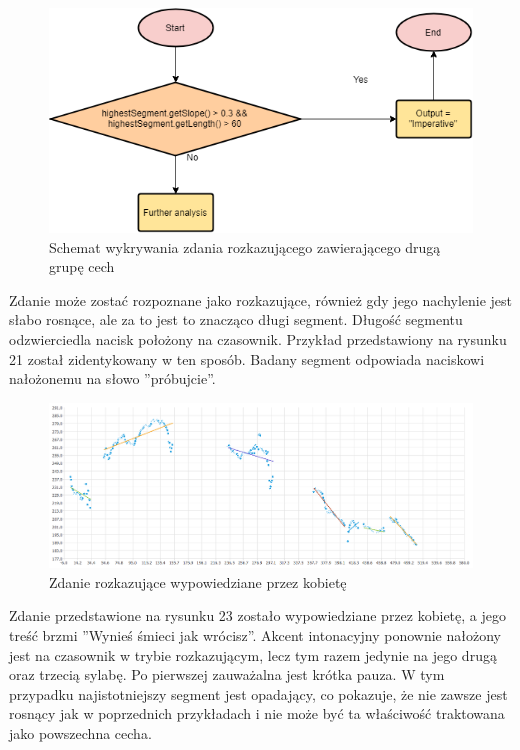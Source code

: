 \documentclass[a4paper,12 pt]{report}
\begin{document}
 \FloatBarrier
\begin{figure}[h]
\centering
\includegraphics[scale=0.9]{Imperative2.png}
\caption{Schemat wykrywania zdania rozkazującego zawierającego drugą grupę cech}
\end{figure}
\FloatBarrier
Zdanie może zostać rozpoznane jako rozkazujące, również gdy jego nachylenie jest słabo rosnące, ale za to jest to znacząco długi segment. Długość segmentu odzwierciedla nacisk położony na czasownik. Przykład przedstawiony na rysunku 21 został zidentykowany w ten sposób. Badany segment odpowiada naciskowi nałożonemu na słowo ''próbujcie''.
 \FloatBarrier
\begin{figure}[h]
\centering
\includegraphics[scale=0.6]{rozkaz_3.png}
\caption{Zdanie rozkazujące wypowiedziane przez kobietę}
\end{figure}
\FloatBarrier
Zdanie przedstawione na rysunku 23 zostało wypowiedziane przez kobietę, a jego treść brzmi ''Wynieś śmieci jak wrócisz''. Akcent intonacyjny ponownie nałożony jest na czasownik w trybie rozkazującym, lecz tym razem jedynie na jego drugą oraz trzecią sylabę. Po pierwszej zauważalna jest krótka pauza.
W tym przypadku najistotniejszy segment jest opadający, co pokazuje, że nie zawsze jest rosnący jak w poprzednich przykładach i nie może być ta właściwość traktowana jako powszechna cecha.
 \FloatBarrier
\end{document}
